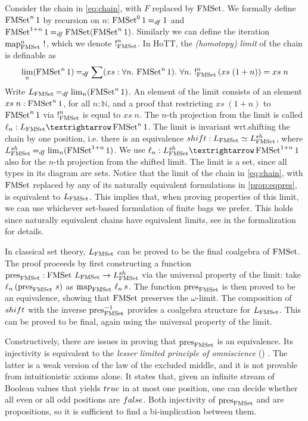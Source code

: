 \documentclass[final,a4paper,USenglish,cleveref]{lipics-v2021}
\begin{document}
Consider the chain in \eqref{eq:chain}, with $F$ replaced by $\FMSet$. We formally define $\FMSet^n 1$ by recursion on $n$: $\FMSet^0 1 \DefEq 1$ and $\FMSet^{1 + n} 1 \DefEq \FMSet (\FMSet^n 1)$. Similarly we can define the iteration $\Map{\FMSet}^n\,\Bang$, which we denote $\Bang^n_{\FMSet}$.
In HoTT, the \emph{(homotopy) limit} of the chain is definable as
\[
\lim_{n} (\FMSet^n 1) \DefEq \sum (xs : \forall n \Where \FMSet^n 1) \Where \forall n \Where
  \Bang^n_{\FMSet}\,(xs\;(1 + n)) = xs\;n
\]
Write $\Lim{\FMSet} \DefEq \lim_{n} (\FMSet^n 1)$. An element of the limit consists of an element $xs\;n : \FMSet^n 1$, for all $n : ℕ$, and a proof that restricting $xs\;(1 + n)$ to $\FMSet^n 1$ via $\Bang^n_{\FMSet}$ is equal to $xs\;n$. The $n$-th projection from the limit is called $\ell_n : \Lim{\FMSet} → \FMSet^n 1$. The limit is invariant wrt.\@ shifting the chain by one position, i.e. there is an equivalence $\shift : \Lim{\FMSet} \simeq \LimSh{\FMSet}$, where $\LimSh{\FMSet} \DefEq \lim_{n} (\FMSet^{1 + n} 1)$. We use $\ell_n : \LimSh{\FMSet} → \FMSet^{1+n} 1$ also for the $n$-th projection from the shifted limit.
The limit is a set, since all types in its diagram are sets.
Notice that the limit of the chain in \eqref{eq:chain}, with $\FMSet$ replaced by any of its naturally equivalent formulations in \cref{prop:eqpres}, is equivalent to $\Lim{\FMSet}$. This implies that, when proving properties of this limit, we can use whichever set-based formulation of finite bags we prefer.
This holds since naturally equivalent chains have equivalent limits, see  in the formalization for details.

In classical set theory, $\Lim{\FMSet}$ can be proved to be the final coalgebra of $\FMSet$. The proof proceeds by first constructing a function $\pres{\FMSet} : \FMSet \,\Lim{\FMSet} \to \LimSh{\FMSet}$ via the universal property of the limit: take $\ell_n\,(\pres{\FMSet} \,s)$ as $\Map{\FMSet}\,\ell_n \,s$. The function $\pres{\FMSet}$ is then proved to be an equivalence, showing that $\FMSet$ preserves the $\omega$-limit. The composition of $\shift$ with the inverse $\pres{\FMSet}^{-1}$ provides a coalgebra structure for $\Lim{\FMSet}$. This can be proved to be final, again using the universal property of the limit.

Constructively, there are issues in proving that $\pres{\FMSet}$ is an equivalence. Its injectivity is equivalent to the \emph{lesser limited principle of omniscience} (\LLPO{}) \cite[{Ch.\@ 1}]{Bridges1987}. The latter is a weak version of the law of the excluded middle, and it is not provable from intuitionistic axioms alone.  It states that, given an infinite stream of Boolean
values that yields $\True$ in at most one position, one can decide
whether all even or all odd positions are $\False$.
Both injectivity of $\pres{\FMSet}$ and \LLPO{} are propositions, so it is sufficient to find a bi-implication between them. %
\end{document}
